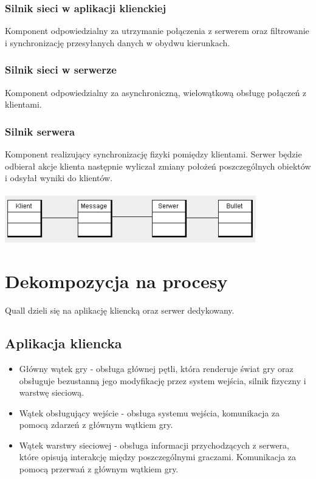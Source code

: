 \documentclass[12pt,a4paper,twoside]{article}
\begin{document}
\subsubsection{Silnik sieci w aplikacji klienckiej}
Komponent odpowiedzialny za utrzymanie połączenia z serwerem oraz filtrowanie i synchronizację przesyłanych danych w obydwu kierunkach.
\subsubsection{Silnik sieci w serwerze}
Komponent odpowiedzialny za asynchroniczną, wielowątkową obsługę połączeń z klientami.
\subsubsection{Silnik serwera}
Komponent realizujący synchronizację fizyki pomiędzy klientami. Serwer będzie odbierał akcje klienta następnie wyliczał zmiany położeń poszczególnych obiektów i odsyłał wyniki do klientów.\\
\\
\includegraphics{pics/classdiagram.png}

\section{Dekompozycja na procesy}


Quall dzieli się na aplikację kliencką oraz serwer dedykowany.

\subsection{Aplikacja kliencka}

\begin{itemize}
\item Główny wątek gry - obsługa głównej pętli, która renderuje świat gry oraz obsługuje bezustanną jego modyfikację przez system wejścia, silnik fizyczny i warstwę sieciową.
\item Wątek obsługujący wejście - obsługa systemu wejścia, komunikacja za pomocą zdarzeń z głównym wątkiem gry.
\item Wątek warstwy sieciowej - obsługa informacji przychodzących z serwera, które opisują interakcję między poszczególnymi graczami. Komunikacja za pomocą przerwań z głównym wątkiem gry.
\end{itemize}
\end{document}
